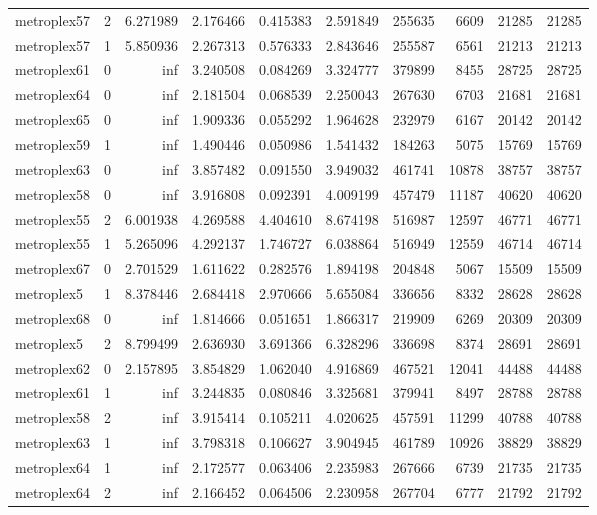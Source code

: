 \documentclass[../../../thesis.tex]{subfiles}
\begin{document}
\begin{longtable}{|l|r|r|r|r|r|r|r|r|r|}
metroplex57 & 2 & 6.271989 & 2.176466 & 0.415383 & 2.591849 & 255635 & 6609 & 21285 & 21285 \\
metroplex57 & 1 & 5.850936 & 2.267313 & 0.576333 & 2.843646 & 255587 & 6561 & 21213 & 21213 \\
metroplex61 & 0 & inf & 3.240508 & 0.084269 & 3.324777 & 379899 & 8455 & 28725 & 28725 \\
metroplex64 & 0 & inf & 2.181504 & 0.068539 & 2.250043 & 267630 & 6703 & 21681 & 21681 \\
metroplex65 & 0 & inf & 1.909336 & 0.055292 & 1.964628 & 232979 & 6167 & 20142 & 20142 \\
metroplex59 & 1 & inf & 1.490446 & 0.050986 & 1.541432 & 184263 & 5075 & 15769 & 15769 \\
metroplex63 & 0 & inf & 3.857482 & 0.091550 & 3.949032 & 461741 & 10878 & 38757 & 38757 \\
metroplex58 & 0 & inf & 3.916808 & 0.092391 & 4.009199 & 457479 & 11187 & 40620 & 40620 \\
metroplex55 & 2 & 6.001938 & 4.269588 & 4.404610 & 8.674198 & 516987 & 12597 & 46771 & 46771 \\
metroplex55 & 1 & 5.265096 & 4.292137 & 1.746727 & 6.038864 & 516949 & 12559 & 46714 & 46714 \\
metroplex67 & 0 & 2.701529 & 1.611622 & 0.282576 & 1.894198 & 204848 & 5067 & 15509 & 15509 \\
metroplex5 & 1 & 8.378446 & 2.684418 & 2.970666 & 5.655084 & 336656 & 8332 & 28628 & 28628 \\
metroplex68 & 0 & inf & 1.814666 & 0.051651 & 1.866317 & 219909 & 6269 & 20309 & 20309 \\
metroplex5 & 2 & 8.799499 & 2.636930 & 3.691366 & 6.328296 & 336698 & 8374 & 28691 & 28691 \\
metroplex62 & 0 & 2.157895 & 3.854829 & 1.062040 & 4.916869 & 467521 & 12041 & 44488 & 44488 \\
metroplex61 & 1 & inf & 3.244835 & 0.080846 & 3.325681 & 379941 & 8497 & 28788 & 28788 \\
metroplex58 & 2 & inf & 3.915414 & 0.105211 & 4.020625 & 457591 & 11299 & 40788 & 40788 \\
metroplex63 & 1 & inf & 3.798318 & 0.106627 & 3.904945 & 461789 & 10926 & 38829 & 38829 \\
metroplex64 & 1 & inf & 2.172577 & 0.063406 & 2.235983 & 267666 & 6739 & 21735 & 21735 \\
metroplex64 & 2 & inf & 2.166452 & 0.064506 & 2.230958 & 267704 & 6777 & 21792 & 21792 \\

\end{longtable}
\end{document}
